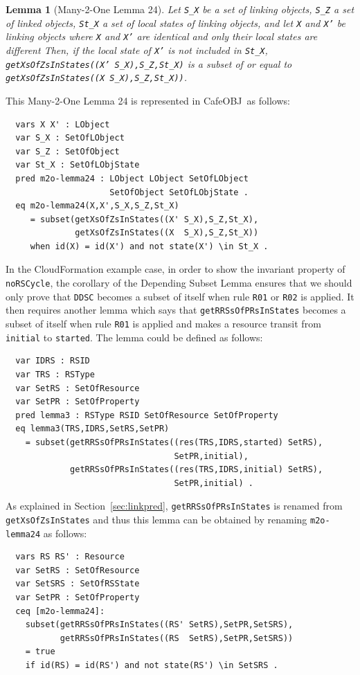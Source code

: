 \documentclass[12pt]{report}
\newtheorem{lemma}{Lemma}
\newcommand{\stt}[1]{{\small{\tt {#1}}}}
\newcommand{\cafeobj}{{\sf CafeOBJ}~}
\begin{document}
\begin{lemma}[Many-2-One Lemma 24]
  Let {\tt S\_X} be a set of linking objects, {\tt S\_Z} a set of
  linked objects, {\tt St\_X} a set of local states of linking
  objects, and let {\tt X} and {\tt X'} be linking objects where {\tt X}
  and {\tt X'} are identical and only their local states are different
  Then, if the local state of {\tt X'} is not included in {\tt St\_X},
  \stt{getXsOfZsInStates((X' S\_X),S\_Z,St\_X)} is a subset of or equal to
  \stt{getXsOfZsInStates((X S\_X),S\_Z,St\_X))}.
\end{lemma}
This Many-2-One Lemma 24 is represented in \cafeobj as follows:
\small
\begin{verbatim}
  vars X X' : LObject
  var S_X : SetOfLObject
  var S_Z : SetOfObject
  var St_X : SetOfLObjState
  pred m2o-lemma24 : LObject LObject SetOfLObject
                     SetOfObject SetOfLObjState .
  eq m2o-lemma24(X,X',S_X,S_Z,St_X)
     = subset(getXsOfZsInStates((X' S_X),S_Z,St_X),
              getXsOfZsInStates((X  S_X),S_Z,St_X))
     when id(X) = id(X') and not state(X') \in St_X .
\end{verbatim}
\normalsize
In the CloudFormation example case, in order to show the invariant
property of {\tt noRSCycle}, the corollary of the Depending Subset
Lemma ensures that we should only prove that {\tt DDSC} becomes a
subset of itself when rule {\tt R01} or {\tt R02} is applied. It then
requires another lemma which says that {\tt getRRSsOfPRsInStates}
becomes a subset of itself when rule {\tt R01} is applied and makes a
resource transit from {\tt initial} to {\tt started}.  The lemma could
be defined as follows:
\small
\begin{verbatim}
  var IDRS : RSID 
  var TRS : RSType
  var SetRS : SetOfResource
  var SetPR : SetOfProperty
  pred lemma3 : RSType RSID SetOfResource SetOfProperty
  eq lemma3(TRS,IDRS,SetRS,SetPR)
    = subset(getRRSsOfPRsInStates((res(TRS,IDRS,started) SetRS),
                                  SetPR,initial), 
             getRRSsOfPRsInStates((res(TRS,IDRS,initial) SetRS),
                                  SetPR,initial) .
\end{verbatim}
\normalsize
As explained in Section~\ref{sec:linkpred}, {\tt getRRSsOfPRsInStates}
is renamed from {\tt getXsOfZsInStates} and thus this lemma can be obtained
by renaming {\tt m2o-lemma24} as follows:
\small
\begin{verbatim}
  vars RS RS' : Resource
  var SetRS : SetOfResource
  var SetSRS : SetOfRSState
  var SetPR : SetOfProperty
  ceq [m2o-lemma24]:
    subset(getRRSsOfPRsInStates((RS' SetRS),SetPR,SetSRS),
           getRRSsOfPRsInStates((RS  SetRS),SetPR,SetSRS))
    = true
    if id(RS) = id(RS') and not state(RS') \in SetSRS .
\end{verbatim}
\normalsize
\end{document}
